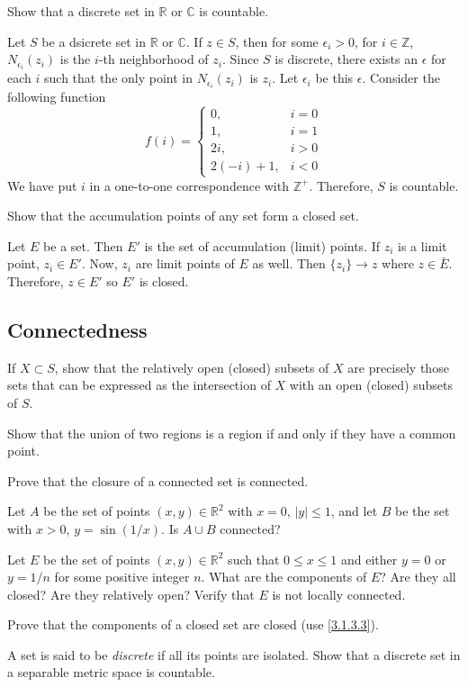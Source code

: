 \begin{exercise}[ref = \arabic{exercisei}]
  Show that a discrete set in \(\mathbb{R}\) or \(\mathbb{C}\) is countable.
  \par\smallskip
  Let \(S\) be a dsicrete set in \(\mathbb{R}\) or \(\mathbb{C}\).
  If \(z\in S\), then for some \(\epsilon_i > 0\), for \(i\in\mathbb{Z}\),
  \(N_{\epsilon_i}(z_i)\) is the \(i\)-th neighborhood of \(z_i\).
  Since \(S\) is discrete, there exists an \(\epsilon\) for each \(i\) such
  that the only point in \(N_{\epsilon_i}(z_i)\) is \(z_i\).
  Let \(\epsilon_i\) be this \(\epsilon\). 
  Consider the following function
  \[
  f(i) =
  \begin{cases}
    0, & i = 0\\
    1, & i = 1\\
    2i, & i > 0\\
    2(-i) + 1, & i < 0
  \end{cases}
  \]
  We have put \(i\) in a one-to-one correspondence with \(\mathbb{Z}^+\).
  Therefore, \(S\) is countable.
\item
  Show that the accumulation points of any set form a closed set.
  \par\smallskip
  Let \(E\) be a set.
  Then \(E'\) is the set of accumulation (limit) points.
  If \(z_i\) is a limit point, \(z_i\in E'\).
  Now, \(z_i\) are limit points of \(E\) as well.
  Then \(\{z_i\}\to z\) where \(z\in\bar{E}\).
  Therefore, \(z\in E'\) so \(E'\) is closed.
\end{exercise}

\subsection{Connectedness}

\begin{exercise}[ref = \arabic{exercisei}]
\item
  If \(X\subset S\), show that the relatively open (closed) subsets of \(X\)
  are precisely those sets that can be expressed as the intersection of \(X\)
  with an open (closed) subsets of \(S\).
\item
  Show that the union of two regions is a region if and only if they have a
  common point.
\item
  \label{3.1.3.3}
  Prove that the closure of a connected set is connected.
\item
  Let \(A\) be the set of points \((x,y)\in\mathbb{R}^2\) with \(x = 0\),
  \(\lvert y\rvert\leq 1\), and let \(B\) be the set with \(x > 0\),
  \(y = \sin(1/x)\).
  Is \(A\cup B\) connected?
\item
  Let \(E\) be the set of points \((x,y)\in\mathbb{R}^2\) such that
  \(0\leq x\leq 1\) and either \(y = 0\) or \(y = 1/n\) for some positive
  integer \(n\).
  What are the components of \(E\)?
  Are they all closed?
  Are they relatively open?
  Verify that \(E\) is not locally connected.
\item
  Prove that the components of a closed set are closed (use \cref{3.1.3.3}).
\item
  A set is said to be \textit{discrete} if all its points are isolated.
  Show that a discrete set in a separable metric space is countable.
\end{exercise}
